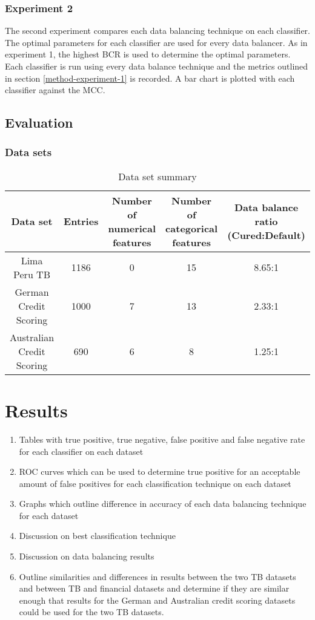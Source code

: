 \documentclass{sig-alternate-05-2015}
\begin{document}
	\subsubsection{Experiment 2}
	The second experiment compares each data balancing technique on each classifier. The optimal parameters for each classifier are used for every data balancer. As in experiment 1, the highest BCR is used to determine the optimal parameters. Each classifier is run using every data balance technique and the metrics outlined in section \ref{method-experiment-1} is recorded. A bar chart is plotted with each classifier against the MCC.
	
	\subsection{Evaluation}
	
	\subsubsection{Data sets}
	\begin{table*}
		\centering
		\caption{Data set summary}
		\label{table:australian_dataset}
		\begin{tabular}{c|c|c|c|c} \hline	
			Data set&Entries&Number of numerical features&Number of categorical features&Data balance ratio (Cured:Default)\\ \hline
			Lima Peru TB \cite{Lackey:10356751520150601}&1186&0&15&8.65:1 \\
			German Credit Scoring&1000&7&13&2.33:1 \\
			Australian Credit Scoring&690&6&8&1.25:1
		\end{tabular}
	\end{table*}
	
	
	\section{Results}
	\begin{enumerate}
		\item Tables with true positive, true negative, false positive and false negative rate for each classifier on each dataset
		\item ROC curves which can be used to determine true positive for an acceptable amount of false positives for each classification technique on each dataset
		\item Graphs which outline difference in accuracy of each data balancing technique for each dataset
		\item Discussion on best classification technique
		\item Discussion on data balancing results
		\item Outline similarities and differences in results between the two TB datasets and between TB and financial datasets and determine if they are similar enough that results for the German and Australian credit scoring datasets could be used for the two TB datasets.
	\end{enumerate}
	
\end{document}
